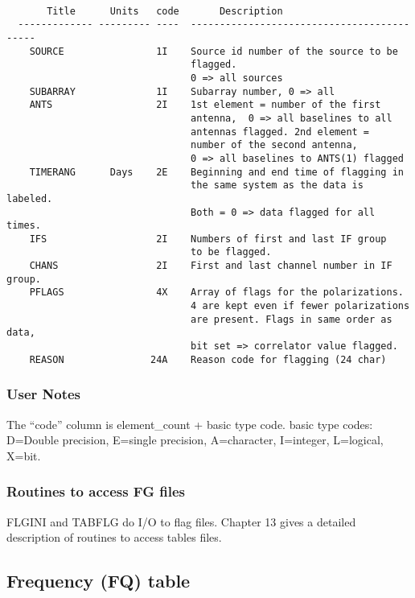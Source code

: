 \begin{verbatim}

       Title      Units   code       Description
  ------------- --------- ----  -------------------------------------------
    SOURCE                1I    Source id number of the source to be
                                flagged.
                                0 => all sources
    SUBARRAY              1I    Subarray number, 0 => all
    ANTS                  2I    1st element = number of the first
                                antenna,  0 => all baselines to all
                                antennas flagged. 2nd element =
                                number of the second antenna,
                                0 => all baselines to ANTS(1) flagged
    TIMERANG      Days    2E    Beginning and end time of flagging in
                                the same system as the data is labeled.
                                Both = 0 => data flagged for all times.
    IFS                   2I    Numbers of first and last IF group
                                to be flagged.
    CHANS                 2I    First and last channel number in IF group.
    PFLAGS                4X    Array of flags for the polarizations.
                                4 are kept even if fewer polarizations
                                are present. Flags in same order as data,
                                bit set => correlator value flagged.
    REASON               24A    Reason code for flagging (24 char)
\end{verbatim}

\subsubsection{User Notes}

  The ``code'' column is element\_count + basic type code.
basic type codes: D=Double precision, E=single precision, A=character,
I=integer, L=logical, X=bit.


\subsubsection{Routines to access FG files}

     FLGINI and TABFLG do I/O to flag
files. Chapter 13 gives a detailed description of routines to access
tables files.

\subsection{Frequency (FQ) table}
